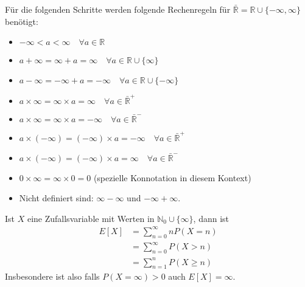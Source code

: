\documentclass[a4paper,12pt]{article}
\begin{document}
Für die folgenden Schritte werden folgende Rechenregeln für $\bar{\mathbb{R}} = \mathbb{R} \cup \{-\infty, \infty\}$ benötigt:
\begin{itemize}
\item $-\infty < a < \infty \quad \forall  a \in \mathbb{R}$
\item $a + \infty = \infty + a = \infty \quad \forall a \in \mathbb{R}\cup \{\infty\}$
\item $a - \infty = -\infty + a = - \infty \quad \forall a \in \mathbb{R}\cup \{-\infty\}$
\item $a\times \infty = \infty \times a = \infty \quad \forall a \in \bar{\mathbb{R}}^+$
\item $a\times \infty = \infty \times a = - \infty \quad \forall a \in \bar{\mathbb{R}}^-$
\item $a \times (-\infty) = (-\infty) \times a = -\infty \quad \forall a \in \bar{\mathbb{R}}^+$
\item $a \times (-\infty) = (-\infty) \times a = \infty \quad \forall a \in \bar{\mathbb{R}}^-$
\item $0 \times \infty = \infty \times 0 = 0$ (spezielle Konnotation in diesem Kontext)
\item Nicht definiert sind: $\infty -\infty$ und $-\infty + \infty$.
\end{itemize}
Ist $X$ eine Zufallsvariable mit Werten in $\mathbb{N}_0\cup\{\infty\}$, dann ist
\begin{align*}
E[X] & = \sum_{n=0}^{\infty}nP(X = n) \\
& = \sum_{n=0}^{\infty}P(X > n)\\
& = \sum_{n=1}^{n}P(X \geq n)
\end{align*}
Insbesondere ist also falls $P(X = \infty) > 0$ auch $E[X] = \infty$.
\end{document}
